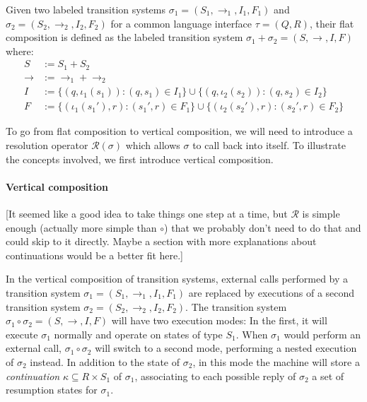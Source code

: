 \documentclass[acmsmall,10pt,review,anonymous]{acmart}
\begin{document}
\begin{definition}
Given two labeled transition systems
$\sigma_1 = (S_1, \rightarrow_1, I_1, F_1)$ and
$\sigma_2 = (S_2, \rightarrow_2, I_2, F_2)$
for a common language interface $\tau = (Q, R)$,
their flat composition is defined as
the labeled transition system
$\sigma_1 + \sigma_2 = (S, \rightarrow, I, F)$
where:
\begin{align*}
  S &:= S_1 + S_2 \\
  {\rightarrow} &:= {\rightarrow_1} + {\rightarrow_2} \\
  I &:= \{ (q, \iota_1(s_1)) : (q, s_1) \in I_1 \}
   \cup \{ (q, \iota_2(s_2)) : (q, s_2) \in I_2 \} \\
  F &:= \{ (\iota_1(s_1'), r) : (s_1', r) \in F_1 \}
   \cup \{ (\iota_2(s_2'), r) : (s_2', r) \in F_2 \}
\end{align*}
\end{definition}

To go from flat composition to vertical composition,
we will need to introduce a resolution operator $\mathcal{R}(\sigma)$
which allows $\sigma$ to call back into itself.
To illustrate the concepts involved,
we first introduce vertical composition.


\paragraph{Vertical composition} %

[It seemed like a good idea to take things one step at a time,
but $\mathcal{R}$ is simple enough (actually more simple than $\circ$)
that we probably don't need to do that and could skip to it directly.
Maybe a section with more explanations about continuations would
be a better fit here.]

In the vertical composition of transition systems,
external calls performed by a transition system
$\sigma_1 = (S_1, \rightarrow_1, I_1, F_1)$
are replaced by executions of a second transition system
$\sigma_2 = (S_2, \rightarrow_2, I_2, F_2)$.
The transition system
$\sigma_1 \circ \sigma_2 = (S, \rightarrow, I, F)$
will have two execution modes:
In the first,
it will execute $\sigma_1$ normally and
operate on states of type $S_1$.
When $\sigma_1$ would perform an external call,
$\sigma_1 \circ \sigma_2$ will switch to a second mode,
performing a nested execution of $\sigma_2$ instead.
In addition to the state of $\sigma_2$,
in this mode the machine will store a \emph{continuation}
$\kappa \subseteq R \times S_1$
of $\sigma_1$,
associating to each possible reply of $\sigma_2$
a set of resumption states for $\sigma_1$.
\end{document}
